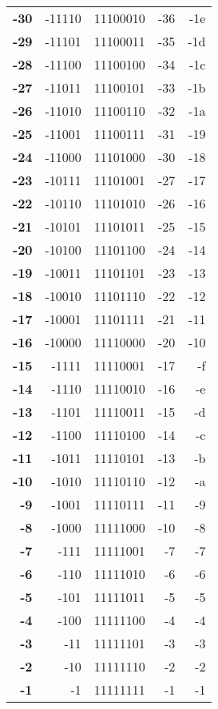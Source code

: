 \documentclass[a4paper]{article}
\begin{document}
\begin{tabular}{|>{\bfseries}r | r | r | r | r |}
-30&-11110&11100010&-36&-1e\\
-29&-11101&11100011&-35&-1d\\
-28&-11100&11100100&-34&-1c\\
-27&-11011&11100101&-33&-1b\\
-26&-11010&11100110&-32&-1a\\
-25&-11001&11100111&-31&-19\\
-24&-11000&11101000&-30&-18\\
-23&-10111&11101001&-27&-17\\
-22&-10110&11101010&-26&-16\\
-21&-10101&11101011&-25&-15\\
-20&-10100&11101100&-24&-14\\
-19&-10011&11101101&-23&-13\\
-18&-10010&11101110&-22&-12\\
-17&-10001&11101111&-21&-11\\
-16&-10000&11110000&-20&-10\\
-15&-1111&11110001&-17&-f\\
-14&-1110&11110010&-16&-e\\
-13&-1101&11110011&-15&-d\\
-12&-1100&11110100&-14&-c\\
-11&-1011&11110101&-13&-b\\
-10&-1010&11110110&-12&-a\\
-9&-1001&11110111&-11&-9\\
-8&-1000&11111000&-10&-8\\
-7&-111&11111001&-7&-7\\
-6&-110&11111010&-6&-6\\
-5&-101&11111011&-5&-5\\
-4&-100&11111100&-4&-4\\
-3&-11&11111101&-3&-3\\
-2&-10&11111110&-2&-2\\
-1&-1&11111111&-1&-1\\
\end{tabular}
\end{document}
